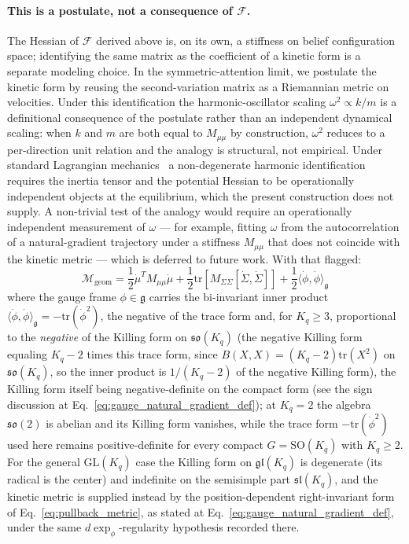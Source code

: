 \documentclass[11pt]{article}
\begin{document}
\paragraph{This is a postulate, not a consequence of $\mathcal{F}$.} The Hessian of $\mathcal{F}$ derived above is, on its own, a stiffness on belief configuration space; identifying the same matrix as the coefficient of a kinetic form is a separate modeling choice. In the symmetric-attention limit, we postulate the kinetic form by reusing the second-variation matrix as a Riemannian metric on velocities. Under this identification the harmonic-oscillator scaling $\omega^2 \propto k/m$ is a definitional consequence of the postulate rather than an independent dynamical scaling: when $k$ and $m$ are both equal to $M_{\mu\mu}$ by construction, $\omega^2$ reduces to a per-direction unit relation and the analogy is structural, not empirical. Under standard Lagrangian mechanics~\cite{arnold1989mathematical} a non-degenerate harmonic identification requires the inertia tensor and the potential Hessian to be operationally independent objects at the equilibrium, which the present construction does not supply. A non-trivial test of the analogy would require an operationally independent measurement of $\omega$ — for example, fitting $\omega$ from the autocorrelation of a natural-gradient trajectory under a stiffness $M_{\mu\mu}$ that does not coincide with the kinetic metric — which is deferred to future work. With that flagged:
\begin{equation}
\mathcal{M}_{\text{geom}} = \frac{1}{2}\dot{\mu}^T M_{\mu\mu} \dot{\mu} + \frac{1}{2}\mathrm{tr}\left[M_{\Sigma\Sigma}[\dot{\Sigma}, \dot{\Sigma}]\right] + \frac{1}{2}\langle\dot{\phi}, \dot{\phi}\rangle_{\mathfrak{g}}
\label{eq:full_kinetic}
\end{equation}
where the gauge frame $\phi \in \mathfrak{g}$ carries the bi-invariant inner product $\langle \dot{\phi}, \dot{\phi} \rangle_{\mathfrak{g}} = -\mathrm{tr}(\dot{\phi}^2)$, the negative of the trace form and, for $K_q \ge 3$, proportional to the \emph{negative} of the Killing form on $\mathfrak{so}(K_q)$ (the negative Killing form equaling $K_q - 2$ times this trace form, since $B(X,X) = (K_q-2)\mathrm{tr}(X^2)$ on $\mathfrak{so}(K_q)$, so the inner product is $1/(K_q-2)$ of the negative Killing form), the Killing form itself being negative-definite on the compact form (see the sign discussion at Eq.~\eqref{eq:gauge_natural_gradient_def}); at $K_q = 2$ the algebra $\mathfrak{so}(2)$ is abelian and its Killing form vanishes, while the trace form $-\mathrm{tr}(\dot{\phi}^2)$ used here remains positive-definite for every compact $G = \mathrm{SO}(K_q)$ with $K_q \ge 2$. For the general $\mathrm{GL}(K_q)$ case the Killing form on $\mathfrak{gl}(K_q)$ is degenerate (its radical is the center) and indefinite on the semisimple part $\mathfrak{sl}(K_q)$, and the kinetic metric is supplied instead by the position-dependent right-invariant form of Eq.~\eqref{eq:pullback_metric}, as stated at Eq.~\eqref{eq:gauge_natural_gradient_def}, under the same $d\exp_\phi$-regularity hypothesis recorded there.
\end{document}
